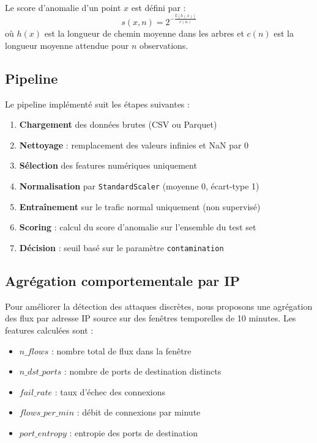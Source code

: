 \documentclass[11pt,a4paper]{article}
\begin{document}
Le score d'anomalie d'un point $x$ est défini par :
\[
s(x, n) = 2^{-\frac{\mathbb{E}[h(x)]}{c(n)}}
\]
où $h(x)$ est la longueur de chemin moyenne dans les arbres et $c(n)$ est
la longueur moyenne attendue pour $n$ observations.

\subsection{Pipeline}

Le pipeline implémenté suit les étapes suivantes :

\begin{enumerate}
    \item \textbf{Chargement} des données brutes (CSV ou Parquet)
    \item \textbf{Nettoyage} : remplacement des valeurs infinies et NaN par 0
    \item \textbf{Sélection} des features numériques uniquement
    \item \textbf{Normalisation} par \texttt{StandardScaler} (moyenne 0, écart-type 1)
    \item \textbf{Entraînement} sur le trafic normal uniquement (non supervisé)
    \item \textbf{Scoring} : calcul du score d'anomalie sur l'ensemble du test set
    \item \textbf{Décision} : seuil basé sur le paramètre \texttt{contamination}
\end{enumerate}

\subsection{Agrégation comportementale par IP}

Pour améliorer la détection des attaques discrètes, nous proposons une
agrégation des flux par adresse IP source sur des fenêtres temporelles de 10
minutes. Les features calculées sont :

\begin{itemize}
    \item $n\_flows$ : nombre total de flux dans la fenêtre
    \item $n\_dst\_ports$ : nombre de ports de destination distincts
    \item $fail\_rate$ : taux d'échec des connexions
    \item $flows\_per\_min$ : débit de connexions par minute
    \item $port\_entropy$ : entropie des ports de destination
\end{itemize}
\end{document}
